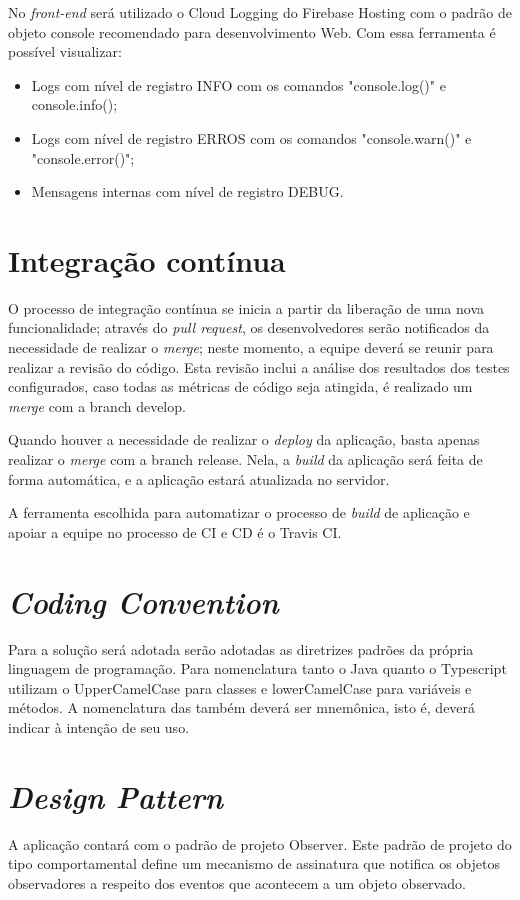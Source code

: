 \documentclass[
    12pt,               %
    openright,          %
    oneside,
    a4paper,            %
    paginasA3,  %
    MODELO,             %
    TODO,               %
    english,            %
    brazil              %
    ]{ifsp-spo-inf-ctds} %
\begin{document}
No \textit{front-end} será utilizado o Cloud Logging do Firebase Hosting com o padrão de objeto console recomendado para desenvolvimento Web. Com essa ferramenta é possível visualizar:
\begin{itemize}
\item Logs com nível de registro INFO com os comandos "console.log()" e console.info();
\item Logs com nível de registro ERROS com os comandos "console.warn()" e "console.error()";
\item Mensagens internas com nível de registro DEBUG.
\end{itemize}
\section{Integração contínua}
O processo de integração contínua se inicia a partir da liberação de uma nova funcionalidade; através do \textit{pull request}, os desenvolvedores serão notificados da necessidade de realizar o \textit{merge}; neste momento, a equipe deverá se reunir para realizar a revisão do código. Esta revisão inclui a análise dos resultados dos testes configurados, caso todas as métricas de código seja atingida, é realizado um \textit{merge} com a branch develop. 

Quando houver a necessidade de realizar o \textit{deploy} da aplicação, basta apenas realizar o \textit{merge} com a branch release. Nela, a \textit{build} da aplicação será feita de forma automática, e a aplicação estará atualizada no servidor. 

A ferramenta escolhida para automatizar o processo de \textit{build} de aplicação e  apoiar a equipe no processo de CI e CD é o Travis CI.

\section{\textit{Coding Convention}}
Para a solução será adotada serão adotadas as diretrizes padrões da própria linguagem de programação. Para nomenclatura tanto o Java quanto o Typescript utilizam o UpperCamelCase para classes e lowerCamelCase para variáveis e métodos. A nomenclatura das também deverá ser mnemônica, isto é, deverá indicar à intenção de seu uso.

\section{\textit{Design Pattern}}
A aplicação contará com o padrão de projeto Observer. Este padrão de projeto do tipo comportamental define um mecanismo de assinatura que notifica os objetos observadores a respeito dos eventos que acontecem a um objeto observado. 
\end{document}
